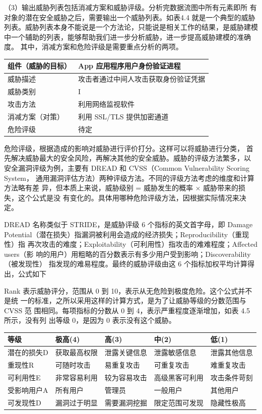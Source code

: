   （3）输出威胁列表包括消减方案和威胁评级。分析完数据流图中所有元素即所
有对象的潜在安全威胁之后，需要输出一个威胁列表。如表4.4 就是一个典型的威胁
列表。威胁列表本身不能说是一个方法论，只能说是相关工作的结果，是威胁建模
中一个辅助的列表，能够帮助我们进一步分析威胁，进一步提高威胁建模的准确度。
其中，消减方案和危险评级是需要重点分析的两项。
\begin{center}
  \begin{tabular}{|l|l|}
    \hline 组件（威胁的目标） & App 应用程序用户身份验证进程 \\
    \hline 威胁描述 & 攻击者通过中间人攻击获取身份验证凭据 \\
    \hline 威胁类别 & I \\
    \hline 攻击方法 & 利用网络监视软件 \\
    \hline 消减方案（对策） & 利用 SSL/TLS 提供加密通道 \\
    \hline 危险评级 & 待定 \\
    \hline
    \end{tabular}
\end{center}
危险评级，根据造成的影响对威胁进行评价打分。这样可以将威胁进行分类，
首先解决威胁最大的安全风险，再解决其他的安全威胁。威胁的评级方法繁多，以
安全漏洞评级为例，主要有 DREAD 和 CVSS（Common Vulnerability Scoring System，
通用漏洞评估方法）两种评级方法。不同的评级方法考虑的维度和计算方法略有差
异，但本质上来说，威胁级别 = 威胁发生的概率 × 威胁带来的损失，这个公式是没
有变化的。具体用哪种危险评级方法，因根据实际情况来决定。

DREAD 名称类似于 STRIDE，是威胁评级 6 个指标的英文首字母，即 Damage
Potential（潜在损失）指漏洞被利用会造成的经济损失；Reproducibility（重现性）指
再次攻击的难度；Exploitability（可利用性）指攻击的难难程度；Affected users（影
响的用户）用粗略的百分数表示有多少用户受到影响；Discoverability（被发现性）
指发现的难易程度。最终的威胁评级由这 6 个指标加权平均计算得出，公式如下


Rank 表示威胁评分，范围从 0 到 10，表示从无危险到极度危险。这个公式并不是统
一的标准，之所以采用这样的计算方式，是为了让威胁等级的分数范围与 CVSS 范
围相同。每项指标的分数从 0 到 4，表示严重程度逐渐增加，如表 4.5 所示，没有列
出等级 0，是因为 0 表示没有这个威胁。
\begin{center}
  \begin{tabular}{|l|l|l|l|l|}
    \hline 等级 & 极高(4) & 高(3) & 中(2) & 低(1) \\
    \hline 潜在的损失D & 获取最高权限 & 泄露关键信息 & 泄露敏感信息 & 泄露其他信息 \\
    \hline 重现性R & 可随时攻击 & 易重复攻击 & 可重复攻击 & 难重复攻击 \\
    \hline 可利用性E & 非常容易利用 & 较为容易攻击 & 高级黑客可利用 & 攻击条件苛刻 \\
    \hline 受影响用户A & 所有用户 & 管理员 & 一般用户 & 其他用户 \\
    \hline 可发现性D & 漏洞过于明显 & 需要漏洞挖掘 & 限定范围可发现 & 隐藏性极高 \\
    \hline
    \end{tabular}
\end{center}

